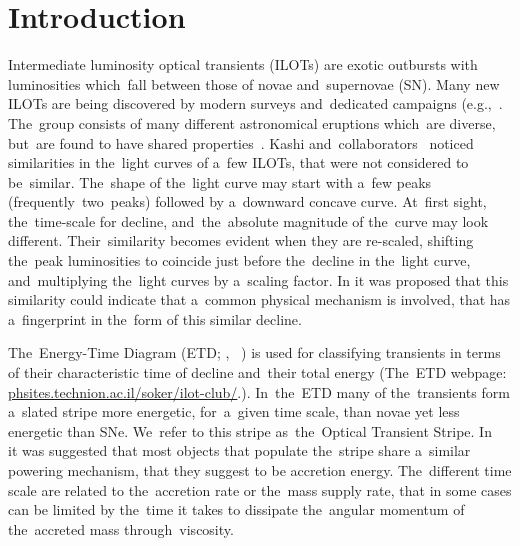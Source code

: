 \documentclass[galaxies,article,accept,moreauthors,pdftex]{mdpi}
\begin{document}


\section{Introduction}
\label{sec:intro}

Intermediate luminosity optical transients (ILOTs) are exotic outbursts with luminosities which~fall between those of novae and~supernovae (SN). Many new ILOTs are being discovered by modern surveys and~dedicated campaigns (e.g.,~\cite{Mouldetal1990, Bondetal2003, Rauetal2007, Rauetal2009, Ofeketal2008, Ofeketal2016, Prietoetal2009, Botticella2009, Smithetal2009, Berger2009a, Berger2009b, KulkarniKasliwal2009, Mason2010, Pastorello2010,Pastorelloetal2019a, Pastorelloetal2019b, Kasliwaletal2011, Kasliwal2013, Tylendaetal2013, Kurtenkovetal2015, Smarttetal2015, Williamsetal2015, Ofeketal2016, Pejchaetal2016a, Pejchaetal2016b, Tartagliaetal2016, Villaretal2016, Humphreysetal2017, Humphreysetal2019, Blagorodnovaetal2017, Adamsetal2018, Bellmetal2019, Jayasingheetal2019}. 
 The~group consists of many different astronomical eruptions which~are diverse, but~are found to have shared properties~\citep{Kashietal2010, SokerKashi2016, Kashi2018Galaxies}. Kashi and~collaborators~\cite{Kashietal2010} noticed similarities in the~light curves of a~few ILOTs, that were not considered to be~similar. The~shape of the~light curve may start with a~few peaks (frequently~two~peaks) followed by a~downward concave curve. At~first sight, the~time-scale for decline, and~the~absolute magnitude of the~curve may look different. Their~similarity becomes evident when they are re-scaled, shifting the~peak luminosities to coincide just before the~decline in the~light curve, and~multiplying the~light curves by a~scaling factor.
In \cite{Kashietal2010} it was proposed that this similarity could indicate that a~common physical mechanism is involved, that has a~fingerprint in the~form of this similar decline.


The~Energy-Time Diagram (ETD; \cite{Kashietal2010}, ~\cite{Kashi2018Galaxies})
 is used for classifying transients in terms of their characteristic time of decline and~their total energy (The~ETD webpage: \url{phsites.technion.ac.il/soker/ilot-club/}.). 
 In~the~ETD many of the~transients form a~slated stripe more energetic, for~a~given time scale, than novae yet less energetic than SNe. We~refer to this stripe as~the~Optical Transient Stripe. In~\cite{Kashietal2010} it was suggested that most objects that populate the~stripe share a~similar powering mechanism, that they suggest to be accretion energy. The~different time scale are related to the~accretion rate or the~mass supply rate, that in some cases can be limited by the~time it takes to dissipate the~angular momentum of the~accreted mass through~viscosity.
\end{document}
